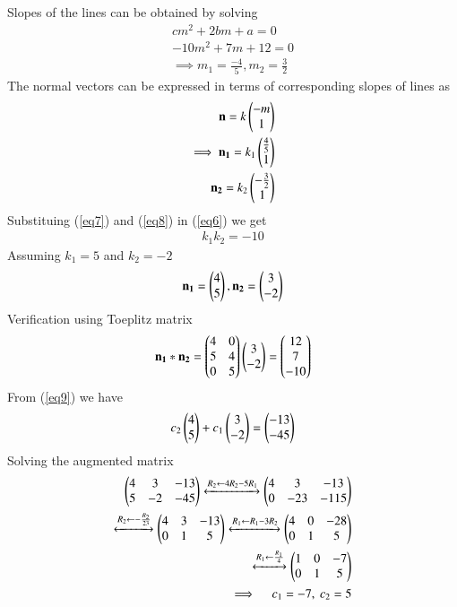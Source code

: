 \documentclass[journal,12pt,twocolumn]{IEEEtran}
\begin{document}
Slopes of the lines can be obtained by solving 
\begin{align}
	cm^2+2bm+a=0 \\
	-10m^2+7m+12=0 \\
	\implies m_1 = \frac{-4}{5}, m_2 = \frac{3}{2}
\end{align}
The normal vectors can be expressed in terms of corresponding slopes of lines as
\begin{align}
	\vec{n}=k\myvec{-m\\1} \\
	\implies
	\vec{n_1}=k_1\myvec{\frac{4}{5} \\ 1}  \label{eq7} \\
	\vec{n_2}=k_2\myvec{-\frac{3}{2} \\ 1}  \label{eq8}
\end{align}
Substituing (\ref{eq7}) and (\ref{eq8}) in (\ref{eq6}) we get
\begin{align}
	k_1k_2=-10
\end{align}
Assuming $ k_1=5$ and $k_2 =-2$
\begin{align}
	\mathbf{n_1}=\begin{pmatrix}4\\5\end{pmatrix}, \mathbf{n_2}=\begin{pmatrix}3\\-2\end{pmatrix}
\end{align}
Verification using Toeplitz matrix
\begin{align}
\mathbf{n_1}*\mathbf{n_2}=\begin{pmatrix}4 & 0 \\ 5 & 4 \\0 & 5\end{pmatrix}\begin{pmatrix}3\\-2\end{pmatrix}=\begin{pmatrix}12\\7\\-10\end{pmatrix}
\end{align}
From (\ref{eq9}) we have
\begin{align}
	c_2\begin{pmatrix}4\\5\end{pmatrix}+c_1\begin{pmatrix}3\\-2\end{pmatrix}=\begin{pmatrix}-13\\-45\end{pmatrix}
\end{align}
Solving the augmented matrix
\begin{align}
	\begin{pmatrix}4 & 3 & -13 \\ 5 & -2 & -45\end{pmatrix}
	\xleftrightarrow[]{R_2 \leftarrow 4R_2-5R_1}
	\begin{pmatrix}4 & 3 & -13 \\ 0 & -23 & -115\end{pmatrix}\\
	\xleftrightarrow[]{R_2 \leftarrow -\frac{R_2}{23}}
        \begin{pmatrix}4 & 3 & -13 \\ 0 & 1 & 5\end{pmatrix}
        \xleftrightarrow[]{R_1 \leftarrow R_1-3R_2}
	\begin{pmatrix}4 & 0 & -28 \\ 0 & 1 & 5\end{pmatrix}\\
	\xleftrightarrow[]{R_1 \leftarrow \frac{R_1}{4}}
        \begin{pmatrix}1 & 0 & -7 \\ 0 & 1 & 5\end{pmatrix} \\
	\implies \quad c_1 =-7, \ c_2 =5
\end{align}
\end{document}
